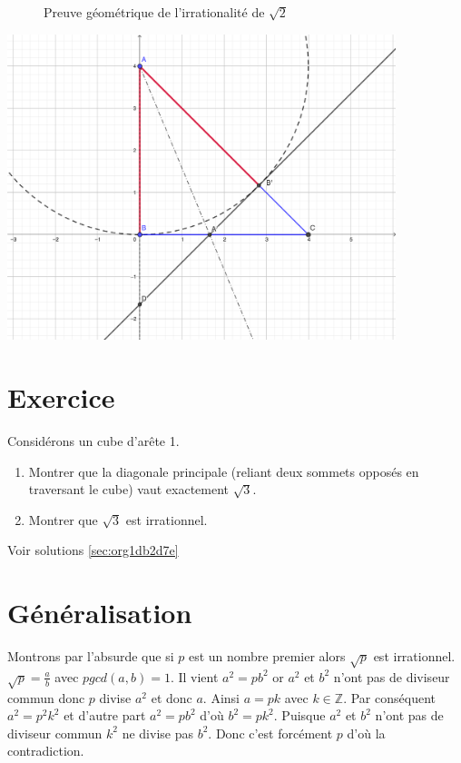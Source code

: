 \documentclass[a4paper, 11pt, twoside]{book}
\newcommand{\Z}{\mathbb{Z}}
\begin{document}
\begin{enumerate}
\begin{figure}[htbp]
\centering

\caption{\label{fig:orgc500ab1}Preuve géométrique de l'irrationalité de \(\sqrt{2}\)}
\end{figure}
\includegraphics[width=0.85\textwidth]{./img/isorectangle-sqrt2-png.png}
\end{enumerate}



\section{Exercice}
\label{sec:orgf8bcce0}
Considérons un cube d'arête 1.
\begin{enumerate}
\item Montrer que la diagonale principale (reliant deux sommets
opposés en traversant le cube) vaut exactement \(\sqrt{3}\).
\item Montrer que \(\sqrt{3}\) est irrationnel.
\end{enumerate}


Voir solutions \ref{sec:org1db2d7e}

\section{Généralisation}
\label{sec:org8110f95}

Montrons par l'absurde que si \(p\) est un nombre premier alors
\(\sqrt{p}\) est irrationnel. \(\sqrt{p} = \frac{a}{b}\) avec \(pgcd(a,
    b) = 1\). Il vient \(a^2 = pb^2\) or \(a^2\) et \(b^2\) n'ont pas de
diviseur commun donc \(p\) divise \(a^2\) et donc \(a\). Ainsi \(a = pk\)
avec \(k\in\Z\). Par conséquent \(a^2 = p^2k^2\) et d'autre
part \(a^2 = pb^2\) d'où \(b^2 = pk^2\). Puisque \(a^2\) et \(b^2\) n'ont
pas de diviseur commun \(k^2\) ne divise pas \(b^2\). Donc c'est
forcément \(p\) d'où la contradiction.
\end{document}
